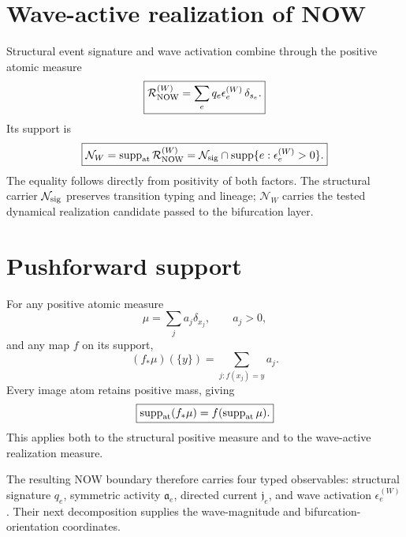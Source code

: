 \section{Wave-active realization of NOW}

Structural event signature and wave activation combine through the positive atomic measure
\[
\boxed{
\mathcal R_{\rm NOW}^{(W)}
=\sum_e q_e\epsilon_e^{(W)}\,\delta_{s_e}.
}
\]
Its support is
\[
\boxed{
\mathcal N_W
=\operatorname{supp}_{\rm at}\mathcal R_{\rm NOW}^{(W)}
=\mathcal N_{\rm sig}
\cap
\operatorname{supp}\{e:\epsilon_e^{(W)}>0\}.
}
\]
The equality follows directly from positivity of both factors.  The structural carrier $\mathcal N_{\rm sig}$ preserves transition typing and lineage; $\mathcal N_W$ carries the tested dynamical realization candidate passed to the bifurcation layer.

\section{Pushforward support}

For any positive atomic measure
\[
\mu=\sum_j a_j\delta_{x_j},
\qquad a_j>0,
\]
and any map $f$ on its support,
\[
(f_*\mu)(\{y\})
=\sum_{j:f(x_j)=y}a_j.
\]
Every image atom retains positive mass, giving
\[
\boxed{
\operatorname{supp}_{\rm at}(f_*\mu)
=f(\operatorname{supp}_{\rm at}\mu).
}
\]
This applies both to the structural positive measure and to the wave-active realization measure.

The resulting NOW boundary therefore carries four typed observables: structural signature $q_e$, symmetric activity $\mathfrak a_e$, directed current $\mathfrak j_e$, and wave activation $\epsilon_e^{(W)}$.  Their next decomposition supplies the wave-magnitude and bifurcation-orientation coordinates.
